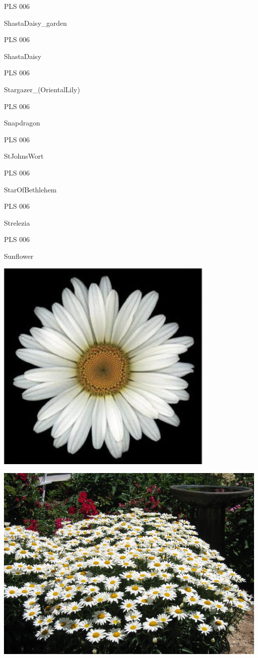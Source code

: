 \documentclass{article}
\begin{document}
\noindent  PLS 006
\vfill
\centerline{{\huge ShastaDaisy\_garden }}
\vfill
\newpage

\noindent  PLS 006
\vfill
\centerline{{\huge ShastaDaisy }}
\vfill
\newpage

\noindent  PLS 006
\vfill
\centerline{{\huge Stargazer\_(OrientalLily) }}
\vfill
\newpage

\noindent  PLS 006
\vfill
\centerline{{\huge Snapdragon }}
\vfill
\newpage

\noindent  PLS 006
\vfill
\centerline{{\huge StJohnsWort }}
\vfill
\newpage

\noindent  PLS 006
\vfill
\centerline{{\huge StarOfBethlehem }}
\vfill
\newpage

\noindent  PLS 006
\vfill
\centerline{{\huge Strelezia }}
\vfill
\newpage

\noindent  PLS 006
\vfill
\centerline{{\huge Sunflower }}
\vfill
\newpage

\begin{center}
\includegraphics[height=0.925\paperheight]{../ShastaDaisy.jpg}
\end{center}
\newpage

\begin{center}
\includegraphics[height=0.925\paperheight]{../ShastaDaisy_garden.jpg}
\end{center}
\newpage
\end{document}

